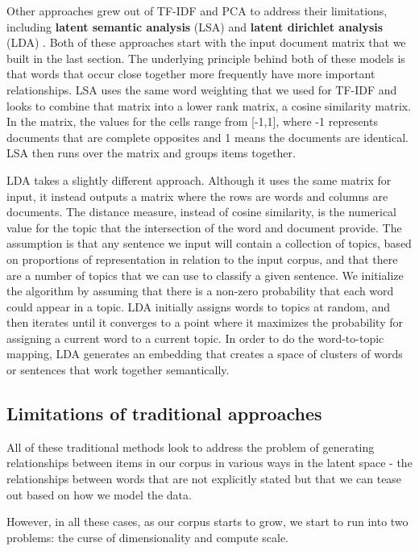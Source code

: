 \documentclass[11pt, table]{diazessay} %
\begin{document}
\begin{sloppypar}
Other approaches grew out of TF-IDF and PCA to address their limitations, including \textbf{latent semantic analysis} (LSA) and \textbf{latent dirichlet analysis} (LDA) \cite{cvitanic2016lda}.  Both of these approaches start with the input document matrix that we built in the last section. The underlying principle behind both of these models is that words that occur close together more frequently have more important relationships. LSA uses the same word weighting that we used for TF-IDF and looks to combine that matrix into a lower rank matrix, a cosine similarity matrix. In the matrix, the values for the cells range from [-1,1], where -1 represents documents that are complete opposites and 1 means the documents are identical. LSA then runs over the matrix and groups items together.  

LDA takes a slightly different approach. Although it uses the same matrix for input, it instead outputs a matrix where the rows are words and columns are documents. The distance measure, instead of cosine similarity, is the numerical value for the topic that the intersection of the word and document provide.  The assumption is that any sentence we input will contain a collection of topics, based on proportions of representation in relation to the input corpus, and that there are a number of topics that we can use to classify a given sentence. We initialize the algorithm by assuming that there is a non-zero probability that each word could appear in a topic. LDA initially assigns words to topics at random, and then iterates until it converges to a point where it maximizes the probability for assigning a current word to a current topic.  In order to do the word-to-topic mapping, LDA generates an embedding that creates a space of clusters of words or sentences that work together semantically.

\subsection{Limitations of traditional approaches}
 
 All of these traditional methods look to address the problem of generating relationships between items in our corpus in various ways in the latent space - the relationships between words that are not explicitly stated but that we can tease out based on how we model the data.
 
 However, in all these cases, as our corpus starts to grow, we start to run into two problems: the curse of dimensionality and compute scale.
 

\end{sloppypar}
\end{document}
